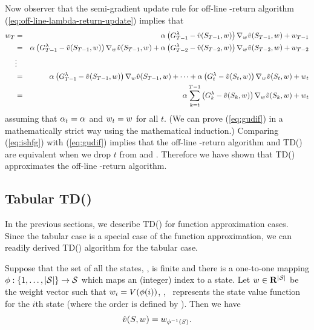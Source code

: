 Now observer that the semi-gradient update rule for off-line \tdparam-return algorithm
(\ref{eq:off-line-lambda-return-update}) implies that
\begin{eqnarray}
\nonumber
{w_{T}}
&=& \alpha_{} \left( G^{\lambda}_{T-1} - \hat{v}(S_{T-1}, {w_{}}) \right) \nabla_{{w_{}}} \hat{v}(S_{T-1}, {w_{}})
+ {w_{T-1}}
\\
\nonumber
&=&
\alpha_{} \left( G^{\lambda}_{T-1} - \hat{v}(S_{T-1}, {w_{}}) \right) \nabla_{{w_{}}} \hat{v}(S_{T-1}, {w_{}})
+ \alpha_{} \left( G^{\lambda}_{T-2} - \hat{v}(S_{T-2}, {w_{}}) \right) \nabla_{{w_{}}} \hat{v}(S_{T-2}, {w_{}})
+ {w_{T-2}}
\\
\nonumber
&\vdots&
\\
\nonumber
&=&
\alpha_{} \left( G^{\lambda}_{T-1} - \hat{v}(S_{T-1}, {w_{}}) \right) \nabla_{{w_{}}} \hat{v}(S_{T-1}, {w_{}})
+ \cdots
+ \alpha_{} \left( G^{\lambda}_{t} - \hat{v}(S_{t}, {w_{}}) \right) \nabla_{{w_{}}} \hat{v}(S_{t}, {w_{}})
+ {w_{t}}
\\
&=& \alpha_{} \sum_{k=t}^{T-1}
\left( G^{\lambda}_{k} - \hat{v}(S_{k}, {w_{}}) \right)
\nabla_{{w_{}}} \hat{v}(S_{k},{w_{}})
+ {w_{t}}
\label{eq:gudif}
\end{eqnarray}
assuming that $\alpha_{t} = \alpha_{}$ and ${w_{t}}={w_{}}$ for all $t$.
(We can prove (\ref{eq:gudif}) in a mathematically strict way using the mathematical induction.)
Comparing (\ref{eq:ishfg}) with (\ref{eq:gudif}) implies that
the off-line \tdparam-return algorithm and TD(\tdparam) are equivalent
when we drop $t$ from  and .
Therefore we have shown that TD(\tdparam) approximates the off-line \tdparam-return algorithm.


\subsection{Tabular TD(\tdparam)}

In the previous sections, we describe TD(\tdparam) for function approximation cases.
Since the tabular case is a special case of the function approximation,
we can readily derived TD(\tdparam) algorithm for the tabular case.

Suppose that the set of all the states, \stateset, is finite
and there is a one-to-one mapping $\phi: \{1,\ldots, {|\mathcal{S}|}\} \to \mathcal{S}$
which maps an (integer) index to a state.
Let ${w_{}} \in \mathbf{R}^{{|\mathcal{S}|}}$
be the weight vector such that
${w_{i}} = V(\phi(i))$,
\ie, \ represents the state value function for the $i$th state
(where the order is defined by \indexstatemapping).
Then we have
\begin{equation}
\label{eq:appr-val-fcn-tabular-case}
\hat{v}(S_{}, {w_{}}) = w_{\phi^{-1}(S_{})}.
\end{equation}

